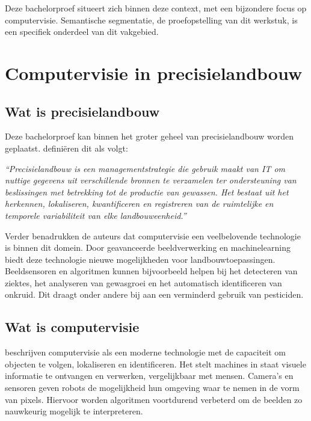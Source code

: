 Deze bachelorproef situeert zich binnen deze context, met een bijzondere focus op computervisie. Semantische segmentatie, de proefopstelling van dit werkstuk, is een specifiek onderdeel van dit vakgebied.

\section{Computervisie in precisielandbouw}
\subsection{Wat is precisielandbouw}
Deze bachelorproef kan binnen het groter geheel van precisielandbouw worden geplaatst. \textcite{Cisternas2020} definiëren dit als volgt: 

\begin{tcolorbox}[colback=gray!5, colframe=white, sharp corners, boxrule=0pt, width=\linewidth]
    \textit{“Precisielandbouw is een managementstrategie die gebruik maakt van IT om nuttige gegevens uit verschillende bronnen te verzamelen ter ondersteuning van beslissingen met betrekking tot de productie van gewassen. Het bestaat uit het herkennen, lokaliseren, kwantificeren en registreren van de ruimtelijke en temporele variabiliteit van elke landbouweenheid.”} 
\end{tcolorbox}

Verder benadrukken de auteurs dat computervisie een veelbelovende technologie is binnen dit domein. Door geavanceerde beeldverwerking en machinelearning biedt deze technologie nieuwe mogelijkheden voor landbouwtoepassingen. Beeldsensoren en algoritmen kunnen bijvoorbeeld helpen bij het detecteren van ziektes, het analyseren van gewasgroei en het automatisch identificeren van onkruid. Dit draagt onder andere bij aan een verminderd gebruik van pesticiden.

\subsection{Wat is computervisie}
\textcite{Radojcic2023} beschrijven computervisie als een moderne technologie met de capaciteit om objecten te volgen, lokaliseren en identificeren. Het stelt machines in staat visuele informatie te ontvangen en verwerken, vergelijkbaar met mensen. Camera’s en sensoren geven robots de mogelijkheid hun omgeving waar te nemen in de vorm van pixels. Hiervoor worden algoritmen voortdurend verbeterd om de beelden zo nauwkeurig mogelijk te interpreteren. 

